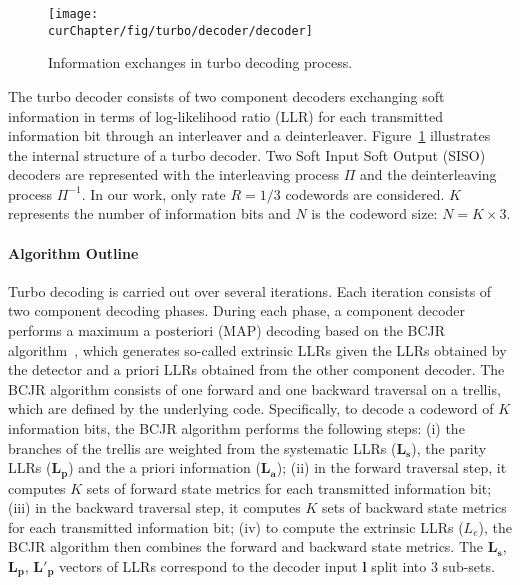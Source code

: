 \begin{figure}[htp]
  \centering
  \texttt{[image: \\curChapter/fig/turbo/decoder/decoder]}
  \caption{Information exchanges in turbo decoding process.}
  \label{fig:ctx_turbo_decoder}
\end{figure}

The turbo decoder consists of two component decoders exchanging soft information
in terms of log-likelihood ratio (LLR) for each transmitted information bit
through an interleaver and a deinterleaver. Figure~\ref{fig:ctx_turbo_decoder}
illustrates the internal structure of a turbo decoder. Two Soft Input Soft
Output (SISO) decoders are represented with the interleaving process $\Pi$ and
the deinterleaving process $\Pi^{-1}$. In our work, only rate $R = 1/3$
codewords are considered. $K$ represents the number of information bits and $N$
is the codeword size: $N = K \times 3$.

\paragraph{Algorithm Outline}

Turbo decoding is carried out over several iterations. Each iteration
consists of two component decoding phases. During each phase, a component
decoder performs a maximum a posteriori (MAP) decoding based on the BCJR
algorithm~\cite{Bahl1974}, which generates so-called extrinsic LLRs given the
LLRs obtained by the detector and a priori LLRs obtained from the other
component decoder. The BCJR algorithm consists of one forward and one backward
traversal on a trellis, which are defined by the underlying code. Specifically,
to decode a codeword of $K$ information bits, the BCJR algorithm performs the
following steps: (i) the branches of the trellis are weighted from the
systematic LLRs ($\bm{L_s}$), the parity LLRs ($\bm{L_p}$) and the a priori
information ($\bm{L_a}$); (ii) in the forward traversal step, it computes $K$
sets of forward state metrics for each transmitted information bit; (iii) in the
backward traversal step, it computes $K$ sets of backward state metrics for each
transmitted information bit; (iv) to compute the extrinsic LLRs ($L_e$), the
BCJR algorithm then combines the forward and backward state metrics. The
$\bm{L_s}$, $\bm{L_p}$, $\bm{L'_p}$ vectors of LLRs correspond to the decoder
input $\bm{l}$ split into 3 sub-sets.

